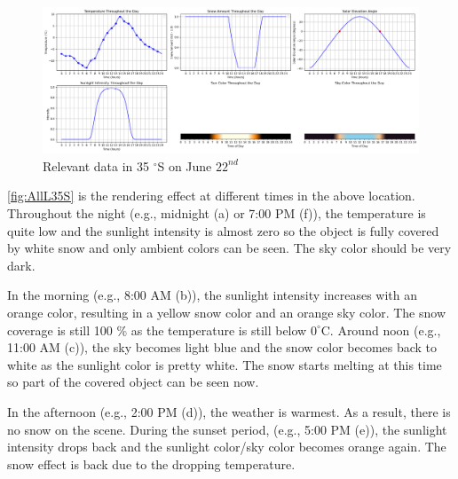 \documentclass{article}
\begin{document}
\begin{figure}[h]
  \centering
  \begin{minipage}{1.00\textwidth}
      \centering
      \includegraphics[width=\textwidth]{images/Plot35N.png}
      \caption{Relevant data in 35 $^{\circ}$S on June \(22^{nd}\)}
      \label{fig:Plot35N}
  \end{minipage}
\end{figure}

\ref{fig:AllL35S} is the rendering effect at different times in the above location. Throughout the night (e.g.,
midnight (a) or 7:00 PM (f)), the temperature is quite low and the sunlight intensity is almost zero so the 
object is fully covered by white snow and only ambient colors can be seen. The sky color should be very dark.

In the morning (e.g., 8:00 AM (b)), the sunlight intensity increases with an orange color, resulting in a yellow
snow color and an orange sky color. The snow coverage is still 100 \% as the temperature is still below 
\(0^\circ\mathrm{C}\). Around noon (e.g., 11:00 AM (c)), the sky becomes light blue and the snow color becomes 
back to white as the sunlight color is pretty white. The snow starts melting at this time so part of the covered 
object can be seen now. 

In the afternoon (e.g., 2:00 PM (d)), the weather is warmest. As a result, there is no snow on the scene. During 
the sunset period, (e.g., 5:00 PM (e)), the sunlight intensity drops back and the sunlight color/sky color becomes
orange again. The snow effect is back due to the dropping temperature.
\end{document}
